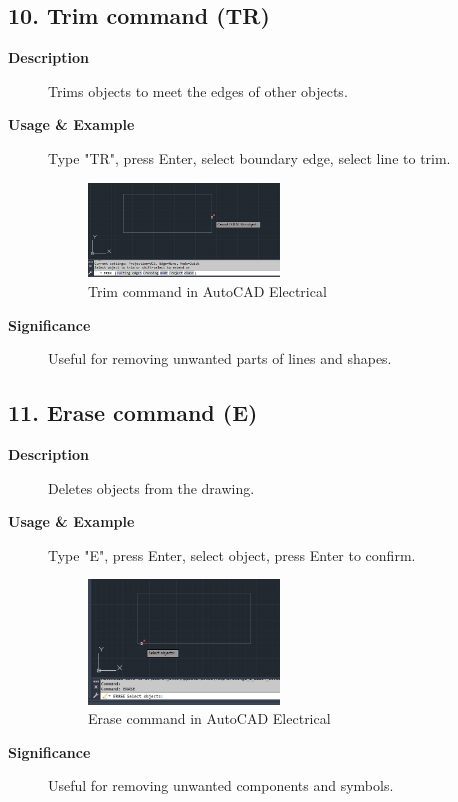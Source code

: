 \documentclass[12pt]{article}
\begin{document}
\subsection*{10. Trim command (TR)}
\begin{description}
    \item [\textbf{Description}] Trims objects to meet the edges of other objects.
    \item [\textbf{Usage \& Example}] Type "TR", press Enter, select boundary edge, select line to trim.
          \begin{figure}[H]
              \centering
              \includegraphics[width=0.5\textwidth]{trim_command.png}
              \caption{Trim command in AutoCAD Electrical}
          \end{figure}
    \item [\textbf{Significance}] Useful for removing unwanted parts of lines and shapes.
\end{description}

\subsection*{11. Erase command (E)}
\begin{description}
    \item [\textbf{Description}] Deletes objects from the drawing.
    \item [\textbf{Usage \& Example}] Type "E", press Enter, select object, press Enter to confirm.
          \begin{figure}[H]
              \centering
              \includegraphics[width=0.5\textwidth]{erase_command.png}
              \caption{Erase command in AutoCAD Electrical}
          \end{figure}
    \item [\textbf{Significance}] Useful for removing unwanted components and symbols.
\end{description}
\end{document}
